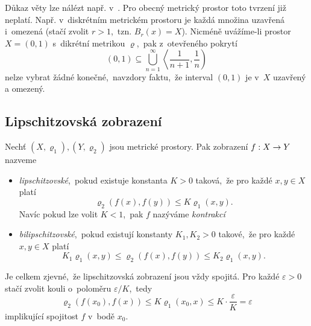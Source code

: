 Důkaz věty lze nálézt např. v~\citep[str. 166]{NetukaAnalyza2014}. Pro obecný metrický prostor toto tvrzení již neplatí. Např. v~diskrétním metrickém prostoru je každá množina uzavřená i~omezená (stačí zvolit $r>1$,~tzn. $B_r(x)=X$). Nicméně uvážíme-li prostor $X=(0,1)$ s~dikrétní metrikou $\varrho$,~pak z~otevřeného pokrytí
\[(0,1)\subseteq\bigcup_{n=1}^\infty\left\langle\dfrac{1}{n+1},\dfrac{1}{n}\right)\]
nelze vybrat žádné konečné,~navzdory faktu,~že interval $(0,1)$ je v~$X$ uzavřený a omezený.


\subsection{Lipschitzovská zobrazení}\label{subsec:lipschitzovska-zobrazeni}

\begin{definition}\label{def:bilipschitzovske-zobrazeni}
    Nechť $(X,\varrho_1),(Y,\varrho_2)$ jsou metrické prostory. Pak zobrazení $f:X \rightarrow Y$ nazveme 
    \begin{itemize}
        \item \emph{lipschitzovské},~pokud existuje konstanta $K>0$ taková,~že pro každé $x,y\in X$ platí
        \[\varrho_2(f(x),f(y))\leqslant K\varrho_1(x,y).\]
        Navíc pokud lze volit $K<1$,~pak $f$ nazýváme \emph{kontrakcí}
        \item \emph{bilipschitzovské},~pokud existují konstanty $K_1,K_2>0$ takové,~že pro každé $x,y\in X$ platí
        \[K_1\varrho_1(x,y)\leqslant\varrho_2(f(x),f(y))\leqslant K_2\varrho_1(x,y).\]
    \end{itemize}
\end{definition}
Je celkem zjevné,~že lipschitzovská zobrazení jsou vždy spojitá. Pro každé $\varepsilon>0$ stačí zvolit kouli o~poloměru $\varepsilon/K$,~tedy
\[\varrho_2(f(x_0),f(x))\leqslant K\varrho_1(x_0,x)\leqslant K\cdot\dfrac{\varepsilon}{K}=\varepsilon\]
implikující spojitost $f$ v~bodě $x_0$.